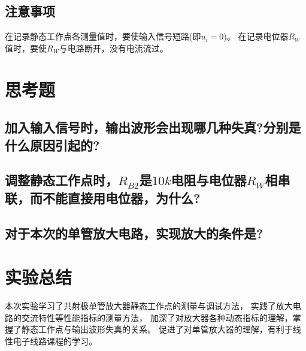\documentclass[a4paper]{article}
\begin{document}
    \subsection{注意事项}\label{subsec:20}
    {{在记录静态工作点各测量值时，要使输入信号短路(即$u_i=0$)。}}
    {{在记录电位器$R_W$值时，要使$R_W$与电路断开，没有电流流过。}}
    \vspace{1cm}


    \section{思考题}\label{sec:8}

    \subsection{加入输入信号时，输出波形会出现哪几种失真?分别是什么原因引起的?}\label{subsec:q1}

    \subsection{调整静态工作点时，$R_{B2}$是$10k$电阻与电位器$R_W$相串联，而不能直接用电位器，为什么?}\label{subsec:q2}

    \subsection{对于本次的单管放大电路，实现放大的条件是?}\label{subsec:q3}
    \vspace{1cm}


    \section{实验总结}\label{sec:9}
    {{本次实验学习了共射极单管放大器静态工作点的测量与调试方法， 实践了放大电路的交流特性等性能指标的测量方法，
    加深了对放大器各种动态指标的理解，掌握了静态工作点与输出波形失真的关系。
    促进了对单管放大器的理解，有利于线性电子线路课程的学习。}}
    \vspace{1cm}

    
    
\end{document}
